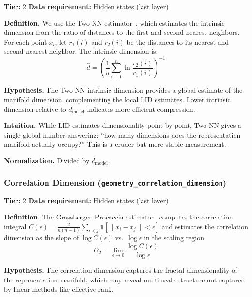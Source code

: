 \documentclass{article}
\begin{document}
\textbf{Tier:} 2 \quad \textbf{Data requirement:} Hidden states (last layer)

\textbf{Definition.}
We use the Two-NN estimator~\citep{facco2017estimating}, which estimates the intrinsic dimension from the ratio of distances to the first and second nearest neighbors. For each point $x_i$, let $r_1(i)$ and $r_2(i)$ be the distances to its nearest and second-nearest neighbor. The intrinsic dimension is:
\begin{equation}
  \hat{d} = \left(\frac{1}{n} \sum_{i=1}^{n} \ln \frac{r_2(i)}{r_1(i)}\right)^{-1}
\end{equation}

\textbf{Hypothesis.}
The Two-NN intrinsic dimension provides a global estimate of the manifold dimension, complementing the local LID estimates. Lower intrinsic dimension relative to $d_{\text{model}}$ indicates more efficient compression.

\textbf{Intuition.}
While LID estimates dimensionality point-by-point, Two-NN gives a single global number answering: ``how many dimensions does the representation manifold actually occupy?'' This is a cruder but more stable measurement.

\textbf{Normalization.} Divided by $d_{\text{model}}$.

\subsubsection{Correlation Dimension (\texttt{geometry\_correlation\_dimension})}
\label{app:corr-dim}

\textbf{Tier:} 2 \quad \textbf{Data requirement:} Hidden states (last layer)

\textbf{Definition.}
The Grassberger--Procaccia estimator~\citep{grassberger1983measuring} computes the correlation integral $C(\epsilon) = \frac{2}{n(n-1)} \sum_{i<j} \mathds{1}[\|x_i - x_j\| < \epsilon]$ and estimates the correlation dimension as the slope of $\log C(\epsilon)$ vs.\ $\log \epsilon$ in the scaling region:
\begin{equation}
  D_2 = \lim_{\epsilon \to 0} \frac{\log C(\epsilon)}{\log \epsilon}
\end{equation}

\textbf{Hypothesis.}
The correlation dimension captures the fractal dimensionality of the representation manifold, which may reveal multi-scale structure not captured by linear methods like effective rank.
\end{document}

